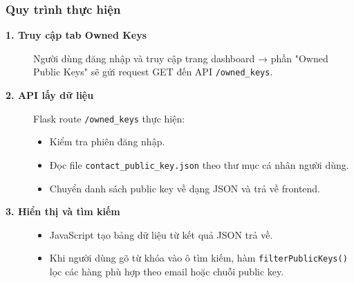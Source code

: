 \subsubsection*{Quy trình thực hiện}
\begin{description}
    \item[\textbf{1. Truy cập tab Owned Keys}]
    Người dùng đăng nhập và truy cập trang dashboard → phần "Owned Public Keys" sẽ gửi request GET đến API \texttt{/owned\_keys}.

    \item[\textbf{2. API lấy dữ liệu}]
    Flask route \texttt{/owned\_keys} thực hiện:
    \begin{itemize}
        \item Kiểm tra phiên đăng nhập.
        \item Đọc file \texttt{contact\_public\_key.json} theo thư mục cá nhân người dùng.
        \item Chuyển danh sách public key về dạng JSON và trả về frontend.
    \end{itemize}

    \item[\textbf{3. Hiển thị và tìm kiếm}]
    \begin{itemize}
        \item JavaScript tạo bảng dữ liệu từ kết quả JSON trả về.
        \item Khi người dùng gõ từ khóa vào ô tìm kiếm, hàm \texttt{filterPublicKeys()} lọc các hàng phù hợp theo email hoặc chuỗi public key.
    \end{itemize}
\end{description}

